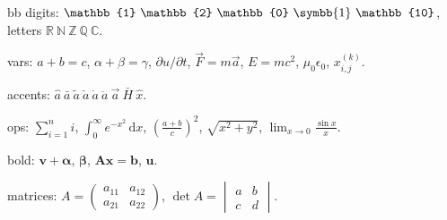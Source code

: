 \documentclass{article}
\begin{document}
bb digits: $\mathbb{1}\ \mathbb{2}\ \mathbb{0}\ \symbb{1}\ \mathbb{10}$,
letters $\mathbb{R}\ \mathbb{N}\ \mathbb{Z}\ \mathbb{Q}\ \mathbb{C}$.

vars: $a+b=c$, $\alpha+\beta=\gamma$, $\partial u/\partial t$, $\vec{F}=m\vec{a}$,
$E=mc^2$, $\mu_0\epsilon_0$, $x_{i,j}^{(k)}$.

accents: $\hat{a}\ \bar{a}\ \tilde{a}\ \check{a}\ \dot{a}\ \ddot{a}\ \vec{a}\ \bar{H}\ \hat{x}$.

ops: $\sum_{i=1}^{n} i$, $\int_{0}^{\infty} e^{-x^2}\,\mathrm{d}x$,
$\left( \frac{a+b}{c} \right)^{2}$, $\sqrt{x^{2}+y^{2}}$, $\lim_{x\to 0}\frac{\sin x}{x}$.

bold: $\symbf{v}+\symbf{\alpha}$, $\boldsymbol{\beta}$, $\mathbf{Ax}=\mathbf{b}$, $\symbf{u}$.

matrices: $A = \begin{pmatrix} a_{11} & a_{12} \\ a_{21} & a_{22} \end{pmatrix}$,
$\det A=\begin{vmatrix} a & b \\ c & d \end{vmatrix}$.
\end{document}
